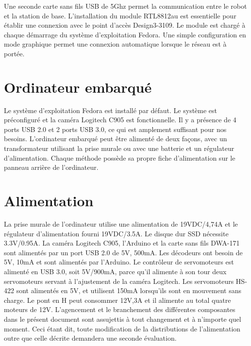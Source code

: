  Une seconde carte sans fils USB de 5Ghz permet la communication entre le robot et la station de base. L'installation du module RTL8812au est essentielle pour établir
 une connexion avec le point d'accès Design3-3109. Le module est chargé à chaque démarrage du système d'exploitation Fedora. Une simple configuration en mode graphique
 permet une connexion automatique lorsque le réseau est à portée.

\section{Ordinateur embarqué}
Le système d'exploitation Fedora est installé par défaut. Le système est préconfiguré et la caméra Logitech C905 est fonctionnelle.  Il y a présence de 4 ports USB 2.0 et 2 ports USB 3.0,
ce qui est amplement suffisant pour nos besoins. L'ordinateur embarqué peut être alimenté de deux façons, avec un transformateur utilisant la prise murale ou avec une batterie et un régulateur d'alimentation.
Chaque méthode possède sa propre fiche d'alimentation sur le panneau arrière de l'ordinateur.


\section{Alimentation}
La prise murale de l'ordinateur utilise une alimentation de 19VDC/4,74A et le régulateur d'alimentation fourni 19VDC/3.5A. Le disque dur SSD nécessite 3.3V/0.95A. La caméra Logitech C905,
l'Arduino et la carte sans fils DWA-171 sont alimentés par un port USB 2.0 de 5V, 500mA. Les décodeurs ont besoin de 5V, 10mA et sont alimentés par l'Arduino. Le contrôleur de servomoteurs
est alimenté en USB 3.0, soit 5V/900mA, parce qu'il alimente à son tour deux servomoteurs servant à l'ajustement de la caméra Logitech. Les servomoteurs HS-422 sont alimentés en 5V,
et utilisent 150mA lorsqu'ils sont en mouvement sans charge. Le pont en H peut consommer 12V,3A et il alimente au total quatre moteurs de 12V. L'agencement et le branchement des différentes
composantes dans le présent document sont assujettis à tout changement et à n'importe quel moment. Ceci étant dit, toute modification de la distributions de l'alimentation outre que celle
décrite demandera une seconde évaluation.

